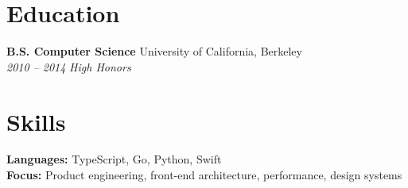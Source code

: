 \documentclass[11pt]{article}
\begin{document}
\section*{Education}
{\bfseries B.S. Computer Science} \hfill University of California, Berkeley\\
\textit{2010 -- 2014} \hfill \textit{High Honors}

\section*{Skills}
{\bfseries Languages:} TypeScript, Go, Python, Swift\\
{\bfseries Focus:} Product engineering, front-end architecture, performance, design systems
\end{document}
